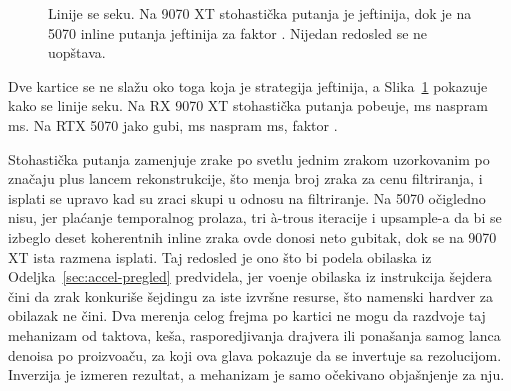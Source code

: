 \begin{figure}[tbp]
\centering
{}
\caption[Cena strategije senki se obr\'ce izme\dj{}u proizvo\dj a\v{c}a]{Linije se seku. Na 9070 XT
stohasti\v{c}ka putanja je jeftinija, dok je na 5070 inline putanja jeftinija za faktor
\perfShadowRatioNV{}. Nijedan redosled se ne uop\v{s}tava.}
\label{fig:shadow-strategy}
\end{figure}

Dve kartice se ne sla\v{z}u oko toga koja je strategija jeftinija, a Slika~\ref{fig:shadow-strategy} pokazuje
kako se linije seku. Na RX 9070 XT stohasti\v{c}ka putanja pobe\dj uje,
\perfShadowStochAMD{} ms naspram \perfShadowInlineAMD{} ms. Na RTX 5070 jako gubi,
\perfShadowStochNV{} ms naspram \perfShadowInlineNV{} ms, faktor \perfShadowRatioNV{}.

Stohasti\v{c}ka putanja zamenjuje zrake po svetlu jednim zrakom uzorkovanim po zna\v{c}aju plus lancem
rekonstrukcije, \v{s}to menja broj zraka za cenu filtriranja, i isplati se upravo kad su zraci skupi u odnosu na
filtriranje. Na 5070 o\v{c}igledno nisu, jer pla\'canje temporalnog prolaza, tri à-trous
iteracije i upsample-a da bi se izbeglo deset koherentnih inline zraka ovde donosi neto gubitak, dok se na
9070 XT ista razmena isplati. Taj redosled je ono \v{s}to bi podela obilaska iz
Odeljka~\ref{sec:accel-pregled} predvidela, jer vo\dj enje obilaska iz instrukcija \v{s}ejdera \v{c}ini da
zrak konkuri\v{s}e \v{s}ejdingu za iste izvr\v{s}ne resurse, \v{s}to namenski hardver za obilazak ne \v{c}ini.
Dva merenja celog frejma po kartici ne mogu da razdvoje taj mehanizam od taktova, ke\v{s}a, rasporedjivanja
drajvera ili pona\v{s}anja samog lanca denoisa po proizvo\dj a\v{c}u, za koji ova glava pokazuje da se
invertuje sa rezolucijom. Inverzija je izmeren rezultat, a mehanizam je samo o\v{c}ekivano
obja\v{s}njenje za nju.

